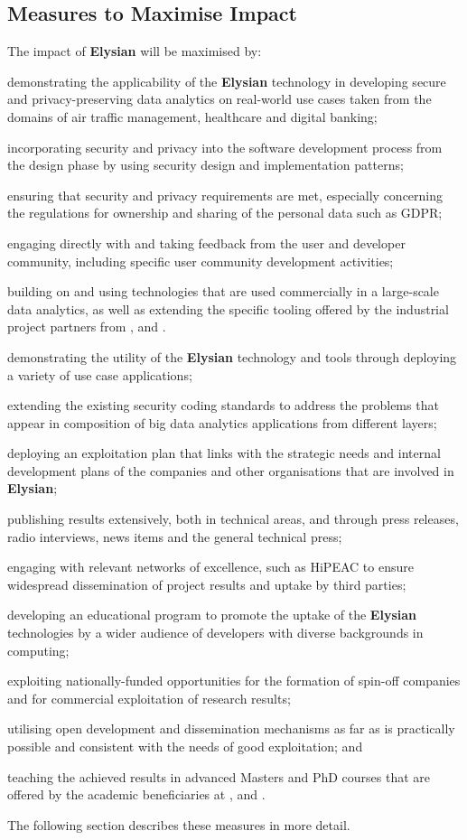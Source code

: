\documentclass[a4paper,11pt]{article}
\newcommand{\project}[1]{\textbf{#1}\xspace}
\newcommand{\SECURITY}{\project{Elysian}}
\newcommand{\TheProject}{\SECURITY}
\begin{document}
\subsection{Measures to Maximise Impact}
The impact of \TheProject{} will be maximised by:
\begin{inparaenum}[i)]
\item
demonstrating the applicability of the \TheProject{} technology in developing secure and privacy-preserving data analytics on real-world use cases taken from the domains of air traffic management, healthcare
and digital banking; %
\item
incorporating security and privacy into the software development process from the design phase by using security design and implementation patterns;
\item
ensuring that security and privacy requirements are met, especially concerning the regulations for ownership and sharing of the personal data such as GDPR;
\item
engaging directly with and taking feedback from the user and developer community, including specific user community development activities;
\item
building on and using technologies that are used commercially in a large-scale data analytics, as well as extending the specific tooling offered by the industrial project partners from \IBMshort{}, \YAGshort{} and \COGNIshort{}.
\item
demonstrating the utility of the \TheProject{} technology and tools through deploying a variety of use case applications;
\item
extending the existing security coding standards to address the problems that appear in composition of big data analytics applications from different layers;
\item
deploying an exploitation plan that links with the strategic needs and internal development plans of the companies and other organisations that are involved in \TheProject;
\item
publishing results extensively, both in technical areas, and through press releases, radio interviews, news items and the general technical press;
\item
engaging with relevant networks of excellence, such as HiPEAC to ensure widespread dissemination of
project results and uptake by third parties;
\item
developing an educational program to promote the uptake of the \TheProject{} technologies by a wider audience of developers with diverse backgrounds in computing;
\item
exploiting nationally-funded opportunities for the formation of spin-off companies and for commercial exploitation of research results;
\item
utilising open development and dissemination mechanisms as far as is practically possible and consistent with the needs of good exploitation; 
and
\item
teaching the achieved results in advanced Masters and PhD courses that are offered by the academic beneficiaries at \SAshort{}, \UODshort{} and \UCMshort{}. 
\end{inparaenum}
%
The following section describes these measures in more detail.
\end{document}

